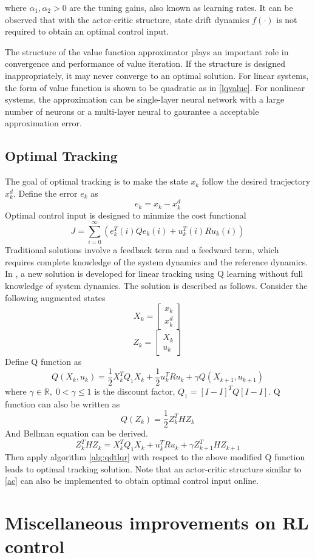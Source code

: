 \documentclass[conference]{IEEEtran}
\begin{document}
where \(\alpha_1, \alpha_2 > 0\) are the tuning gains, also known as learning rates. It can be observed that with the actor-critic structure, state drift dynamics \(f(\cdot)\) is not required to obtain an optimal control input.
\par The structure of the value function approximator plays an important role in convergence and performance of value iteration. If the structure is designed inappropriately, it may never converge to an optimal solution. For linear systems, the form of value function is shown to be quadratic as in \eqref{lqvalue}. For nonlinear systems, the approximation can be single-layer neural network with a large number of neurons or a multi-layer neural to gaurantee a acceptable approximation error.
\subsection{Optimal Tracking}
The goal of optimal tracking is to make the state \(x_k\) follow the desired tracjectory \(x^d_k\). Define the error \(e_k\) as 
\[e_k = x_k - x^d_k\]
Optimal control input is designed to minmize the cost functional
\[J = \sum_{i=0}^\infty(e^T_k(i)Qe_k(i) + u^T_k(i)Ru_k(i))\]
Traditional solutions involve a feedback term and a feedward term, which requires complete knowledge of the system dynamics and the reference dynamics. In \cite{b8}, a new solution is developed for linear tracking using Q learning without full knowledge of system dynamics. The solution is described as follows. Consider the following augmented states
\[X_k = \begin{bmatrix}
x_k \\
x^d_k
\end{bmatrix}\]
\[Z_k =\begin{bmatrix}
X_k\\
u_k
\end{bmatrix} \]
Define Q function as
\[Q(X_k, u_k) = \frac{1}{2}X^T_kQ_1X_k + \frac{1}{2}u^T_kRu_k +\gamma Q(X_{k+1}, u_{k+1})\]
where \(\gamma \in \mathbb{R},\; 0 < \gamma \leq 1\) is the discount factor, \(Q_1 = [I -I]^TQ[I -I]\).
Q function can also be written as 
\[Q(Z_k) = \frac{1}{2}Z^T_kHZ_k \]
And Bellman equation can be derived.
\[Z^T_kHZ_k = X^T_kQ_1X_k + u^T_kRu_k + \gamma Z^T_{k+1}HZ_{k+1} \]
Then apply algorithm \ref{alg:qdtlqr} with respect to the above modified Q function leads to optimal tracking solution. Note that an actor-critic structure similar to \eqref{ac} can also be implemented to obtain optimal control input online.

\section{Miscellaneous improvements on RL control} \label{improve}
\end{document}
